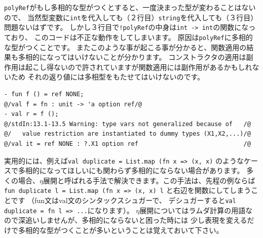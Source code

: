 \documentclass[11pt,a4paper]{article}
\begin{document}
\lstinline{polyRef}がもし多相的な型がつくとすると、一度決まった型が変わることはないので、
当然型変数に\lstinline{int}を代入しても（２行目）\lstinline{string}を代入しても（３行目）問題ないはずです。
しかし３行目で\lstinline{!polyRef}の中身は\lstinline{int -> int}の関数になっており、
このコードは不正な動作をしてしまいます。
原因は\lstinline{polyRef}に多相的な型がつくことです。
またこのような事が起こる事が分かると、関数適用の結果も多相的になってはいけないことが分かります。
コンストラクタの適用は副作用は起こし得ないので許されていますが関数適用には副作用があるかもしれないため
それの返り値には多相型をもたせてはいけないのです。

\begin{lstlisting}[caption=関数の例,label=code:value-restricted-function]
- fun f () = ref NONE;
@/val f = fn : unit -> 'a option ref/@
- val r = f ();
@/stdIn:13.1-13.5 Warning: type vars not generalized because of   /@
@/   value restriction are instantiated to dummy types (X1,X2,...)/@
@/val it = ref NONE : ?.X1 option ref                             /@
\end{lstlisting}

実用的には、例えば\lstinline{val duplicate = List.map (fn x => (x, x)}
のようなケースで多相的になってほしいにも関わらず多相的にならない場合があります。
多くの場合、$\eta$展開と呼ばれる手法で解決できます。この手法は、先程の例ならば
\lstinline{fun duplicate l = List.map (fn x => (x, x) l}
と右辺を関数にしてしまうことです
（fun文はval文のシンタックスシュガーで、
デシュガーすると\lstinline{val duplicate = fn l => ...}になります）。
$\eta$展開についてはラムダ計算の用語なので深追いしませんが、多相的にならないと困った時には
少し表現を変えるだけで多相的な型がつくことが多いということは覚えておいて下さい。
\end{document}
